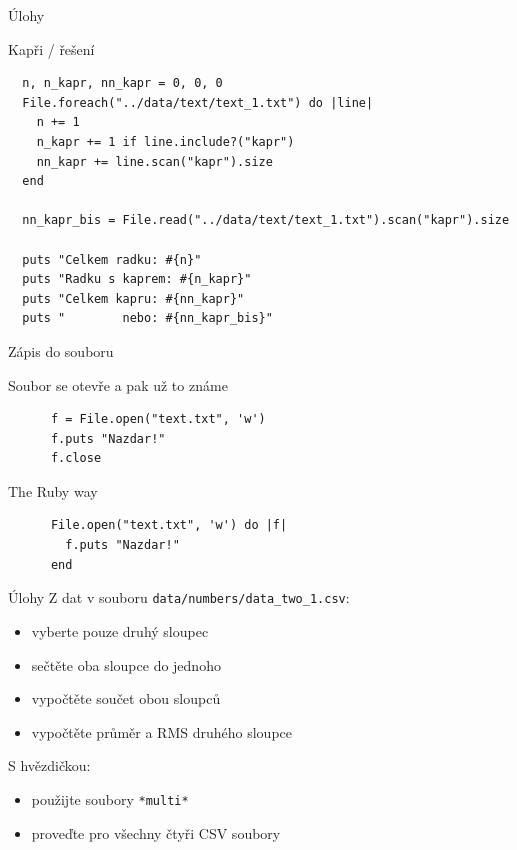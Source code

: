 \documentclass{beamer}
\begin{document}
\begin{frame}[fragile]{Úlohy}
  \begin{block}{Kapři / řešení}
    \tiny
\begin{verbatim}
  n, n_kapr, nn_kapr = 0, 0, 0
  File.foreach("../data/text/text_1.txt") do |line|
    n += 1
    n_kapr += 1 if line.include?("kapr")
    nn_kapr += line.scan("kapr").size
  end

  nn_kapr_bis = File.read("../data/text/text_1.txt").scan("kapr").size

  puts "Celkem radku: #{n}"
  puts "Radku s kaprem: #{n_kapr}"
  puts "Celkem kapru: #{nn_kapr}"
  puts "        nebo: #{nn_kapr_bis}"
\end{verbatim}
  \end{block}
\end{frame}

\begin{frame}[fragile]{Zápis do souboru}
  \begin{block}{Soubor se otevře a pak už to známe}
    \begin{verbatim}
      f = File.open("text.txt", 'w')
      f.puts "Nazdar!"
      f.close
    \end{verbatim}
  \end{block}
  \pause
  \begin{block}{The Ruby way}
    \begin{verbatim}
      File.open("text.txt", 'w') do |f|
        f.puts "Nazdar!"
      end
    \end{verbatim}
  \end{block}
\end{frame}

\begin{frame}{Úlohy}
  Z dat v souboru \texttt{data/numbers/data\_two\_1.csv}:
  \begin{itemize}
    \item vyberte pouze druhý sloupec
    \item sečtěte oba sloupce do jednoho
    \item vypočtěte součet obou sloupců
    \item vypočtěte průměr a RMS druhého sloupce
  \end{itemize}
  S hvězdičkou:
  \begin{itemize}
    \item použijte soubory \texttt{*multi*}
    \item proveďte pro všechny čtyři CSV soubory
  \end{itemize}
\end{frame}
\end{document}
